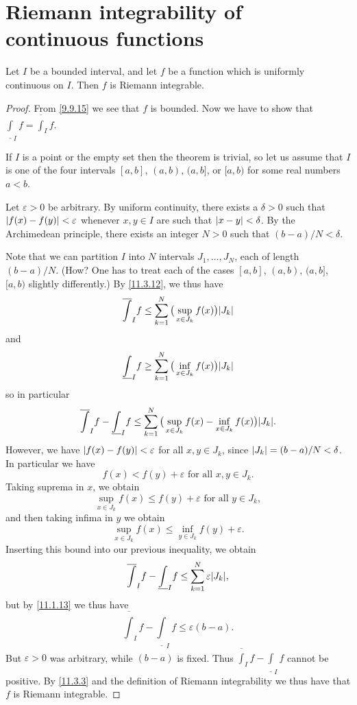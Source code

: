 \section{Riemann integrability of continuous functions}\label{sec 11.5}

\begin{theorem}\label{11.5.1}
  Let \(I\) be a bounded interval, and let \(f\) be a function which is uniformly continuous on \(I\).
  Then \(f\) is Riemann integrable.
\end{theorem}

\begin{proof}
  From \cref{9.9.15} we see that \(f\) is bounded.
  Now we have to show that \(\underline{\int}_I f = \overline{\int}_I f\).

  If \(I\) is a point or the empty set then the theorem is trivial, so let us assume that \(I\) is one of the four intervals \([a, b]\), \((a, b)\), \((a, b]\), or \([a, b)\) for some real numbers \(a < b\).

      Let \(\varepsilon > 0\) be arbitrary.
      By uniform continuity, there exists a \(\delta > 0\) such that \(\left\lvert f(x) - f(y)\right\rvert < \varepsilon\) whenever \(x, y \in I\) are such that \(\left\lvert x - y\right\rvert < \delta\).
      By the Archimedean principle, there exists an integer \(N > 0\) such that \((b - a) / N < \delta\).

      Note that we can partition \(I\) into \(N\) intervals \(J_1, \dots, J_N\), each of length \((b - a) / N\).
      (How? One has to treat each of the cases \([a, b]\), \((a, b)\), \((a, b]\), \([a, b)\) slightly differently.)
  By \cref{11.3.12}, we thus have
  \[
    \overline{\int}_I f \leq \sum_{k = 1}^N \big(\sup_{x \in J_k} f(x)\big) \abs{J_k}
  \]
  and
  \[
    \underline{\int}_I f \geq \sum_{k = 1}^N \big(\inf_{x \in J_k} f(x)\big) \abs{J_k}
  \]
  so in particular
  \[
    \overline{\int}_I f - \underline{\int}_I f \leq \sum_{k = 1}^N \big(\sup_{x \in J_k} f(x) - \inf_{x \in J_k} f(x)\big) \abs{J_k}.
  \]
  However, we have \(\left\lvert f(x) - f(y)\right\rvert < \varepsilon\) for all \(x, y \in J_k\), since \(\left\lvert J_k\right\rvert = (b - a) / N < \delta\).
  In particular we have
  \[
    f(x) < f(y) + \varepsilon \text{ for all } x, y \in J_k.
  \]
  Taking suprema in \(x\), we obtain
  \[
    \sup_{x \in J_k} f(x) \leq f(y) + \varepsilon \text{ for all } y \in J_k,
  \]
  and then taking infima in \(y\) we obtain
  \[
    \sup_{x \in J_k} f(x) \leq \inf_{y \in J_k} f(y) + \varepsilon.
  \]
  Inserting this bound into our previous inequality, we obtain
  \[
    \overline{\int}_I f - \underline{\int}_I f \leq \sum_{k = 1}^N \varepsilon \abs{J_k},
  \]
  but by \cref{11.1.13} we thus have
  \[
    \overline{\int}_I f - \underline{\int}_I f \leq \varepsilon (b - a).
  \]
  But \(\varepsilon > 0\) was arbitrary, while \((b - a)\) is fixed.
  Thus \(\overline{\int}_I f - \underline{\int}_I f\) cannot be positive.
  By \cref{11.3.3} and the definition of Riemann integrability we thus have that \(f\) is Riemann integrable.
\end{proof}

